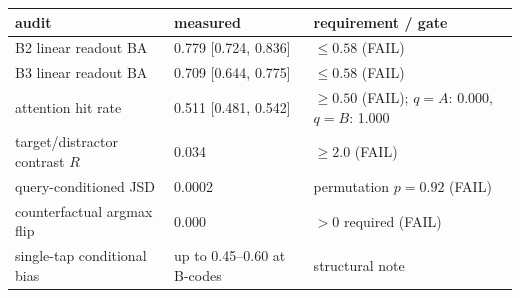 \begingroup\setlength{\tabcolsep}{3pt}\begin{tabular}{p{4.7cm}p{5.3cm}p{4.9cm}}
\toprule
audit & measured & requirement / gate \\
\midrule
B2 linear readout BA & 0.779 [0.724, 0.836] & $\leq 0.58$ (FAIL) \\
B3 linear readout BA & 0.709 [0.644, 0.775] & $\leq 0.58$ (FAIL) \\
attention hit rate & 0.511 [0.481, 0.542] & $\geq 0.50$ (FAIL); $q{=}A$: 0.000, $q{=}B$: 1.000 \\
target/distractor contrast $R$ & 0.034 & $\geq 2.0$ (FAIL) \\
query-conditioned JSD & 0.0002 & permutation $p{=}0.92$ (FAIL) \\
counterfactual argmax flip & 0.000 & $>0$ required (FAIL) \\
single-tap conditional bias & up to 0.45--0.60 at B-codes & structural note \\
\bottomrule
\end{tabular}\endgroup
